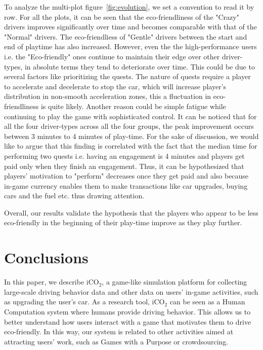 \documentclass[preprint,authoryear,12pt]{elsarticle}
\begin{document}
To analyze the multi-plot figure~\ref{fig:evolution}, we set a convention to read it by row. For all the plots, it can be seen that the eco-friendliness of the "Crazy" drivers improves significantly over time and becomes comparable with that of the "Normal" drivers. The eco-friendliess of "Gentle" drivers between the start and end of playtime has also increased. However, even the  the high-performance users i.e. the "Eco-friendly" ones continue to maintain their edge over other driver-types, in absolute terms they tend to deteriorate over time. This could be due to several factors like prioritizing the quests. The nature of quests require a player to accelerate and decelerate to stop the car, which will increase player's distribution in non-smooth acceleration zones, this a fluctuation in eco-friendliness is quite likely. Another reason could be simple fatigue while continuing to play the game with sophisticated control. It can be noticed that for all the four driver-types across all the four groups, the peak improvement occurs between 3 minutes to 4 minutes of play-time. For the sake of discussion, we would like to argue that this finding is correlated with the fact that the median time for performing two quests i.e. having an engagement is 4 minutes and players get paid only when they finish an engagement. Thus, it can be hypothesized that players' motivation to "perform" decreases once they get paid and also because in-game currency  enables them to make transactions like car upgrades, buying cars and the fuel etc. thus drawing attention. 

Overall, our results validate the hypothesis that the players who appear to be less eco-friendly in the beginning of their play-time improve as they play further. 



\section{Conclusions} \label{sec:conclusions}

In this paper, we describe iCO$_2$, a game-like simulation platform for collecting large-scale driving behavior data and other data on users' in-game activities, such as upgrading the user's car. As a research tool, iCO$_2$ can be seen as a Human Computation system where humans provide driving behavior. This allows us to better understand how users interact with a game that motivates them to drive eco-friendly. In this way, our system is related to other activities aimed at attracting users' work, such as Games with a Purpose or crowdsourcing.
\end{document}
